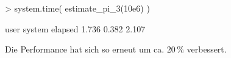 \begin{Schunk}
\begin{Sinput}
> system.time({
   estimate_pi_3(10e6)
 })   
\end{Sinput}
\begin{Soutput}
   user  system elapsed 
  1.736   0.382   2.107 
\end{Soutput}
\end{Schunk}

Die Performance hat sich so erneut um ca. $20\,\%$ verbessert. 

